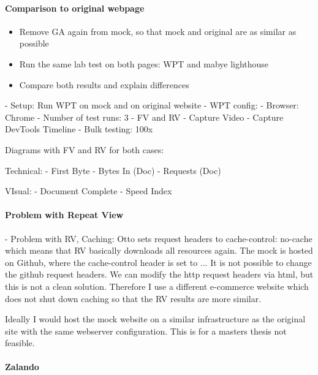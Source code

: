 \paragraph{Comparison to original webpage}

\begin{itemize}
    \item Remove GA again from mock, so that mock and original are as similar as possible
    \item Run the same lab test on both pages: WPT and mabye lighthouse
    \item Compare both results and explain differences
\end{itemize}



- Setup: Run WPT on mock and on original website
- WPT config:
- Browser: Chrome
- Number of test runs: 3
- FV and RV
- Capture Video
- Capture DevTools Timeline
- Bulk testing: 100x



Diagrams with FV and RV for both cases:

Technical:
- First Byte
- Bytes In (Doc)
- Requests (Doc)

VIsual:
- Document Complete
- Speed Index

\paragraph{Problem with Repeat View}

- Problem with RV, Caching:
Otto sets request headers to cache-control: no-cache which means that RV basically downloads all resources again.
The mock is hosted on Github, where the cache-control header is set to ...
It is not possible to change the github request headers. We can modify the http request headers via html, but this is not a clean solution.
Therefore I use a different e-commerce website which does not shut down caching so that the RV results are more similar.

Ideally I would host the mock website on a similar infrastructure as the original site with the same webserver configuration. This is for a masters thesis not feasible.





\paragraph{Zalando}

